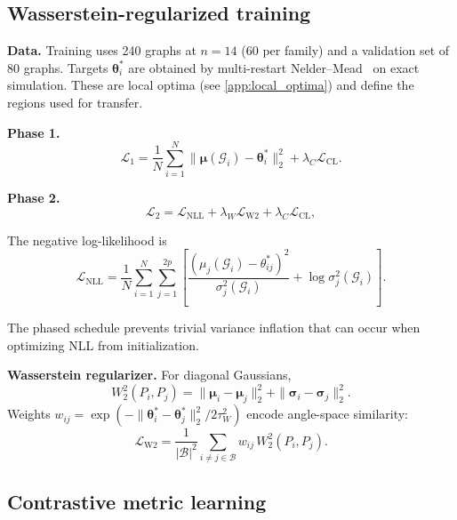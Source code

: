 \documentclass[aps,prx,reprint,superscriptaddress,longbibliography]{revtex4-2}
\newcommand{\calG}{\mathcal{G}}
\newcommand{\calL}{\mathcal{L}}
\newcommand{\calB}{\mathcal{B}}
\begin{document}
\subsection{Wasserstein-regularized training}
\label{sec:training}

\textbf{Data.}
Training uses 240 graphs at $n{=}14$ (60 per family) and a validation
set of 80 graphs. Targets $\bm\theta^*_i$ are obtained by multi-restart
Nelder--Mead~\cite{nelder1965} on exact simulation. These are local
optima (see \cref{app:local_optima}) and define the regions used for
transfer.

\textbf{Phase 1.}
\begin{equation}
    \calL_1 = \frac{1}{N}\sum_{i=1}^{N}
    \|\bm\mu(\calG_i) - \bm\theta^*_i\|_2^2
    + \lambda_C \calL_{\mathrm{CL}}.
    \label{eq:loss_phase1}
\end{equation}

\textbf{Phase 2.}
\begin{equation}
    \calL_2 = \calL_{\mathrm{NLL}}
    + \lambda_W \calL_{\mathrm{W2}}
    + \lambda_C \calL_{\mathrm{CL}},
    \label{eq:loss_phase2}
\end{equation}

The negative log-likelihood is
\begin{equation}
    \calL_{\mathrm{NLL}}
    = \frac{1}{N}\sum_{i=1}^{N}\sum_{j=1}^{2p}
    \left[
    \frac{(\mu_j(\calG_i) - \theta^*_{ij})^2}
    {\sigma_j^2(\calG_i)}
    + \log\sigma_j^2(\calG_i)
    \right].
    \label{eq:loss_nll}
\end{equation}

The phased schedule prevents trivial variance inflation that can occur
when optimizing NLL from initialization.

\textbf{Wasserstein regularizer.}
For diagonal Gaussians,
\begin{equation*}
    W_2^2(P_i,P_j)
    = \|\bm\mu_i - \bm\mu_j\|_2^2
    + \|\bm\sigma_i - \bm\sigma_j\|_2^2.
\end{equation*}
Weights
$w_{ij} = \exp(-\|\bm\theta_i^* - \bm\theta_j^*\|_2^2 / 2\tau_W^2)$
encode angle-space similarity:
\begin{equation}
    \calL_{\mathrm{W2}} = \frac{1}{|\calB|^2}
    \sum_{i \ne j \in \calB} w_{ij}\, W_2^2(P_i,P_j).
    \label{eq:loss_w2}
\end{equation}

\subsection{Contrastive metric learning}
\label{sec:contrastive}
\end{document}
